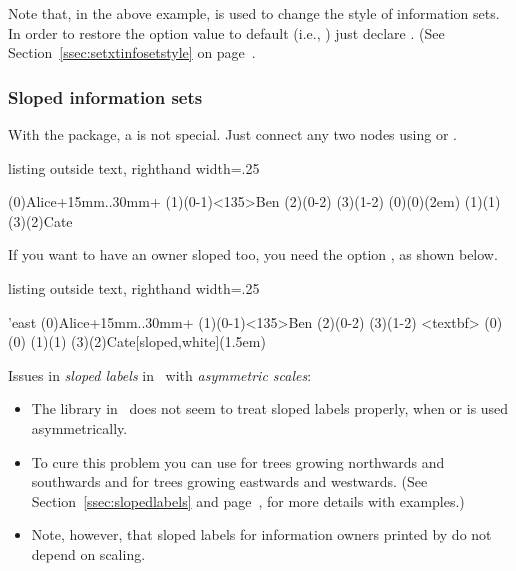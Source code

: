 Note that, in the above example, \cmd{\setxtinfosetstyle} is used to change the style of information sets.
In order to restore the option value to default (i.e., ) just declare \cmd{\setxtinfosetstyle}. (See Section~\ref{ssec:setxtinfosetstyle} on page~\pageref{ssec:setxtinfosetstyle}.

\subsubsection{Sloped information sets}

With the  package, a  is not special. Just connect any two nodes using \cmd{\xtInfoset} or \cmd{\xtInfosetO}.


\begin{tcblisting}{listing outside text, righthand width=.25\linewidth}
\begin{istgame}
\istroot(0){Alice}+15mm..30mm+
    \endist
\istroot(1)(0-1)<135>{Ben}    \endist
\istroot(2)(0-2)     \endist
\istroot(3)(1-2)     \endist
\xtInfosetO(0)(0)(2em)
\xtInfosetO[rectangle](1)(1)
\xtInfosetO(3)(2){Cate}
\end{istgame}
\end{tcblisting}

If you want to have an owner sloped too, you need the option \xw{[sloped]}, as shown below.

\begin{tcblisting}{listing outside text, righthand width=.25\linewidth}
\begin{istgame}
\setistgrowdirection'{east}
\istroot(0){Alice}+15mm..30mm+    \endist
\istroot(1)(0-1)<135>{Ben}    \endist
\istroot(2)(0-2)     \endist
\istroot(3)(1-2)     \endist
{}<textbf>
\xtInfosetO(0)(0)
\xtInfosetO[rectangle,rounded corners=.2em](1)(1)
\xtInfosetO*[ellipse,fill=blue!60]
           (3)(2){Cate}[sloped,white](1.5em)
\end{istgame}
\end{tcblisting}

\warning
Issues in \emph{sloped labels} in \TikZ\ with \emph{asymmetric scales}:
\begin{itemize}\tightlist
\item The  library in \TikZ\ does not seem to treat sloped labels properly, when  or  is used asymmetrically.
\item To cure this problem you can use \cmd{\xtcureslopedlabelsNS} for trees growing northwards and southwards and \cmd{\xtcureslopedlabelsWS} for trees growing eastwards and westwards.
(See Section~\ref{ssec:slopedlabels} and page~\pageref{page:slopedlabels-warning}, for more details with examples.)
\item Note, however, that sloped labels for information owners printed by \cmd{\xtInfosetO} do not depend on scaling.
\end{itemize}

